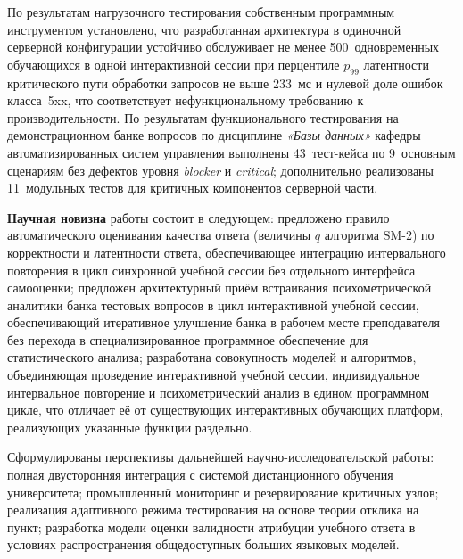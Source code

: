 По результатам нагрузочного тестирования собственным программным
инструментом установлено, что разработанная архитектура в одиночной
серверной конфигурации устойчиво обслуживает не менее
500~одновременных обучающихся в одной интерактивной сессии при
перцентиле $p_{99}$ латентности критического пути обработки
запросов не выше 233~мс и нулевой доле ошибок класса~5xx, что
соответствует нефункциональному требованию к производительности.
По результатам функционального тестирования на демонстрационном
банке вопросов по дисциплине \textit{«Базы данных»} кафедры
автоматизированных систем управления выполнены 43~тест-кейса
по 9~основным сценариям без дефектов уровня \emph{blocker}
и \emph{critical}; дополнительно реализованы 11~модульных тестов
для критичных компонентов серверной части.

\textbf{Научная новизна} работы состоит в следующем: предложено
правило автоматического оценивания качества ответа (величины $q$
алгоритма SM-2) по корректности и латентности ответа,
обеспечивающее интеграцию интервального повторения в цикл
синхронной учебной сессии без отдельного интерфейса самооценки;
предложен архитектурный приём встраивания психометрической
аналитики банка тестовых вопросов в цикл интерактивной учебной
сессии, обеспечивающий итеративное улучшение банка в рабочем
месте преподавателя без перехода в специализированное программное
обеспечение для статистического анализа; разработана совокупность
моделей и алгоритмов, объединяющая проведение интерактивной
учебной сессии, индивидуальное интервальное повторение
и психометрический анализ в едином программном цикле, что отличает
её от существующих интерактивных обучающих платформ, реализующих
указанные функции раздельно.

Сформулированы перспективы дальнейшей научно-исследовательской
работы: полная двусторонняя интеграция с системой дистанционного
обучения университета; промышленный мониторинг и резервирование
критичных узлов; реализация адаптивного режима тестирования
на основе теории отклика на пункт; разработка модели оценки
валидности атрибуции учебного ответа в условиях распространения
общедоступных больших языковых моделей.

\newpage
